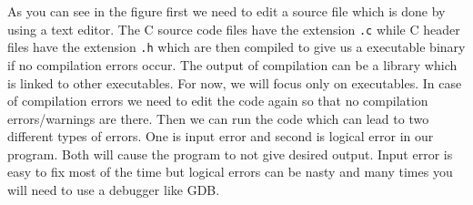 As you can see in the figure first we need to edit a source file which is done
by using a text editor. The C source code files have the extension \texttt{.c}
while C header files have the extension \texttt{.h} which are then compiled to
give us a executable binary if no compilation errors occur. The output of
compilation can be a library which is linked to other executables. For now, we
will focus only on executables. In case of compilation errors we need to edit
the code again so that no compilation errors/warnings are there. Then we can
run the code which can lead to two different types of errors. One is input
error and second is logical error in our program. Both will cause the program
to not give desired output. Input error is easy to fix most of the time but
logical errors can be nasty and many times you will need to use a debugger like
GDB.

